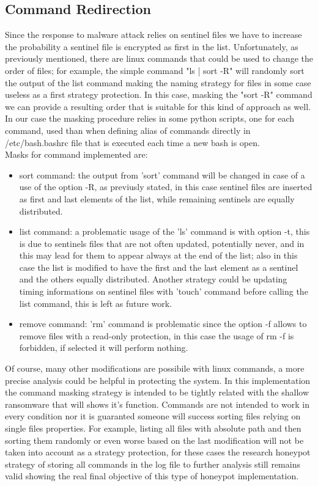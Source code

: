 \subsection{Command Redirection}
Since the response to malware attack relies on sentinel files we have to increase the probability a sentinel file is encrypted as first in the list. Unfortunately, as previously mentioned, there are linux commands that could be used to change the order of files; for example, the simple command "ls | sort -R" will randomly sort the output of the list command making the naming strategy for files in some case useless as a first strategy protection. In this case, masking the "sort -R" command we can provide a resulting order that is suitable for this kind of approach as well. In our case the masking procedure relies in some python scripts, one for each command, used than when defining alias of commands directly in /etc/bash.bashrc file that is executed each time a new bash is open.\\
Masks for command implemented are:
\begin{itemize}
  \item sort command: the output from 'sort' command will be changed in case of a use of the option -R, as previusly stated, in this case sentinel files are inserted as first and last elements of the list, while remaining sentinels are equally distributed.
  \item list command: a problematic usage of the 'ls' command is with option -t, this is due to sentinels files that are not often updated, potentially never, and in this may lead for them to appear always at the end of the list; also in this case the list is modified to have the first and the last element as a sentinel and the others equally distributed. Another strategy could be updating timing informations on sentinel files with 'touch' command before calling the list command, this is left as future work.
  \item remove command: 'rm' command is problematic since the option -f allows to remove files with a read-only protection, in this case the usage of rm -f is forbidden, if selected it will perform nothing.
\end{itemize}
Of course, many other modifications are possibile with linux commands, a more precise analysis could be helpful in protecting the system. In this implementation the command masking strategy is intended to be tightly related with the shallow ransomware that will shows it's function. Commands are not intended to work in every condition nor it is guaranted someone will success sorting files relying on single files properties. For example, listing all files with absolute path and then sorting them randomly or even worse based on the last modification will not be taken into account as a strategy protection, for these cases the research honeypot strategy of storing all commands in the log file to further analysis still remains valid showing the real final objective of this type of honeypot implementation.

